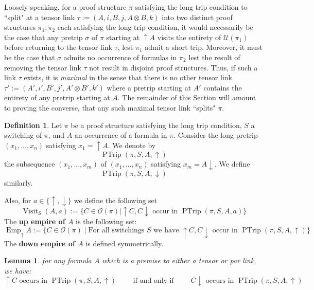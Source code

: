 \documentclass[12pt]{article}
\theoremstyle{plain}
\newtheorem{lemma}[thm]{Lemma}
\theoremstyle{definition}
\newtheorem{defn}[thm]{Definition} %
\newcommand{\call}[1]{\mathcal{#1}}
\begin{document}
	Loosely speaking, for a proof structure $\pi$ satisfying the long trip condition to ``split" at a tensor link $\tau := (A,i,B,j,A\otimes B,k)$ into two distinct proof structures $\pi_1,\pi_2$ each satisfying the long trip condition, it would necessarily be the case that any pretrip $\sigma$ of $\pi$ starting at $\uparrow A$ visits the entirety of $\call{U}(\pi_1)$ before returning to the tensor link $\tau$, lest $\pi_1$ admit a short trip. Moreover, it must be the case that $\sigma$ admits no occurrence of formulas in $\pi_2$ lest the result of removing the tensor link $\tau$ not result in disjoint proof structures. Thus, if such a link $\tau$ exists, it is \emph{maximal} in the sense that there is no other tensor link $\tau' := (A',i',B',j',A' \otimes B',k')$ where a pretrip starting at $A'$ contains the entirety of any pretrip starting at $A$. The remainder of this Section will amount to proving the converse, that any such maximal tensor link ``splits" $\pi$.
	\begin{defn}\label{def:pretrip_from_A}
		Let $\pi$ be a proof structure satisfying the long trip condition, $S$ a switching of $\pi$, and $A$ an occurrence of a formula in $\pi$. Consider the long pretrip $(x_1,...,x_n)$ satisfying $x_1 = \uparrow A$. We denote by
		\begin{equation}
			\operatorname{PTrip}(\pi,S,A,\uparrow)
		\end{equation}
		the subsequence $(x_1,...,x_m)$ of $(x_1,...,x_n)$ satisfying $x_m = A\downarrow$. We define
		\begin{equation}
			\operatorname{PTrip}(\pi, S, A, \downarrow)
		\end{equation}
		similarly.
		
		Also, for $a \in \lbrace \uparrow,\downarrow\rbrace $ we define the following set
		\begin{equation}
			\operatorname{Visit}_S(A,a) := \lbrace C \in \call{O}(\pi) \mid \uparrow C, C\downarrow \text{ occur in } \operatorname{PTrip}(\pi,S,A,a)\rbrace
		\end{equation}
		The \textbf{up empire of $A$} is the following set:
		\begin{equation}
			\operatorname{Emp}_{\uparrow}A := \lbrace C \in \call{O}(\pi) \mid \text{For all switchings }S\text{ we have } \uparrow C, C\downarrow \text{ occur in } \operatorname{PTrip}(\pi,S, A,\uparrow)\rbrace
		\end{equation}
		The \textbf{down empire of $A$} is defined symmetrically.
	\end{defn}
	\begin{lemma}
		for any formula $A$ which is a premise to either a tensor or par link, we have: $$\uparrow C \text{ occurs in } \operatorname{PTrip}(\pi,S,A,\uparrow)\qquad\text{ if and only if }\qquad C\downarrow \text{ occurs in } \operatorname{PTrip}(\pi,S,A,\uparrow)$$
	\end{lemma}
\end{document}
